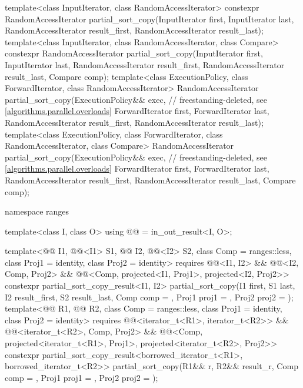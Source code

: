 \begin{codeblock}
{  template<class InputIterator, class RandomAccessIterator>
    constexpr RandomAccessIterator
      partial_sort_copy(InputIterator first, InputIterator last,
                        RandomAccessIterator result_first,
                        RandomAccessIterator result_last);
  template<class InputIterator, class RandomAccessIterator, class Compare>
    constexpr RandomAccessIterator
      partial_sort_copy(InputIterator first, InputIterator last,
                        RandomAccessIterator result_first,
                        RandomAccessIterator result_last,
                        Compare comp);
  template<class ExecutionPolicy, class ForwardIterator, class RandomAccessIterator>
    RandomAccessIterator
      partial_sort_copy(ExecutionPolicy&& exec,                 // freestanding-deleted, see \ref{algorithms.parallel.overloads}
                        ForwardIterator first, ForwardIterator last,
                        RandomAccessIterator result_first,
                        RandomAccessIterator result_last);
  template<class ExecutionPolicy, class ForwardIterator, class RandomAccessIterator,
           class Compare>
    RandomAccessIterator
      partial_sort_copy(ExecutionPolicy&& exec,                 // freestanding-deleted, see \ref{algorithms.parallel.overloads}
                        ForwardIterator first, ForwardIterator last,
                        RandomAccessIterator result_first,
                        RandomAccessIterator result_last,
                        Compare comp);

  namespace ranges {
    template<class I, class O>
      using @@ = in_out_result<I, O>;

    template<@@ I1, @@<I1> S1,
             @@ I2, @@<I2> S2,
             class Comp = ranges::less, class Proj1 = identity, class Proj2 = identity>
      requires @@<I1, I2> && @@<I2, Comp, Proj2> &&
               @@<Comp, projected<I1, Proj1>, projected<I2, Proj2>>
      constexpr partial_sort_copy_result<I1, I2>
        partial_sort_copy(I1 first, S1 last, I2 result_first, S2 result_last,
                          Comp comp = {}, Proj1 proj1 = {}, Proj2 proj2 = {});
    template<@@ R1, @@ R2, class Comp = ranges::less,
             class Proj1 = identity, class Proj2 = identity>
      requires @@<iterator_t<R1>, iterator_t<R2>> &&
               @@<iterator_t<R2>, Comp, Proj2> &&
               @@<Comp, projected<iterator_t<R1>, Proj1>,
                                          projected<iterator_t<R2>, Proj2>>
      constexpr partial_sort_copy_result<borrowed_iterator_t<R1>, borrowed_iterator_t<R2>>
        partial_sort_copy(R1&& r, R2&& result_r, Comp comp = {},
                          Proj1 proj1 = {}, Proj2 proj2 = {});

}}
\end{codeblock}
